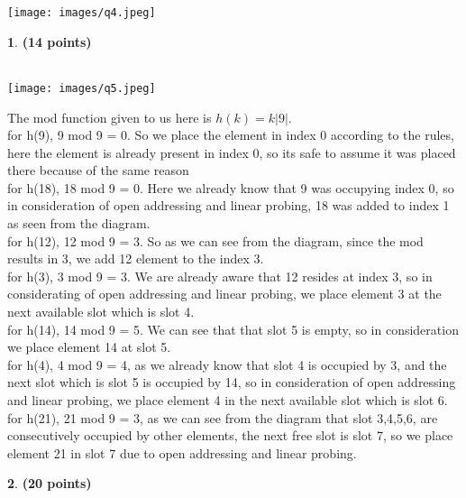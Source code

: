 \documentclass[11pt]{article}
\theoremstyle{definition}
\newtheorem{prob}{}
\newcommand{\solution}{\medskip\noindent{\color{DarkBlue}\textbf{Solution:}}}
\begin{document}
\texttt{[image: images/q4.jpeg]}

\begin{prob} \textbf{(14 points)}
\end{prob}

\solution \\

\texttt{[image: images/q5.jpeg]}

The mod function given to us here is $h(k) = k|9|$. \\

for h(9), 9 mod 9 = 0. So we place the element in index 0 according to the rules, here the element is already present in index 0,
so its safe to assume it was placed there because of the same reason\\

for h(18), 18 mod 9 = 0. Here we already know that 9 was occupying index 0, so in consideration of open addressing and linear probing,
18 was added to index 1 as seen from the diagram. \\

for h(12), 12 mod 9 = 3. So as we can see from the diagram, since the mod results in 3, we add 12 element to the index 3. \\

for h(3), 3 mod 9 = 3. We are already aware that 12 resides at index 3, so in considerating of open addressing and linear probing,
we place element 3 at the next available slot which is slot 4. \\

for h(14), 14 mod 9 = 5. We can see that that slot 5 is empty, so in consideration we place element 14 at slot 5. \\

for h(4), 4 mod 9 = 4, as we already know that slot 4 is occupied by 3, and the next slot which is slot 5 is occupied by 14, so 
in consideration of open addressing and linear probing, we place element 4 in the next available slot which is slot 6. \\

for h(21), 21 mod 9 = 3, as we can see from the diagram that slot 3,4,5,6, are consecutively occupied by other elements, the next free
slot is slot 7, so we place element 21 in slot 7 due to open addressing and linear probing.\\

\begin{prob} \textbf{(20 points)}
\end{prob}
\end{document}
